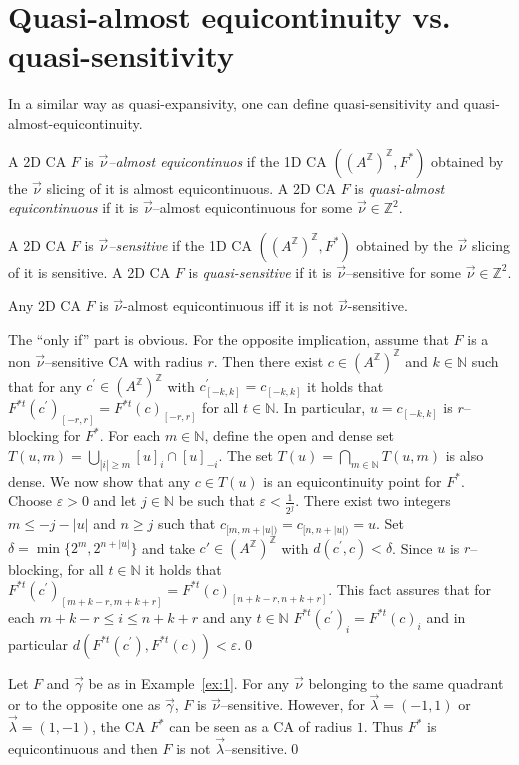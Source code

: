 \documentclass{llncs}
\newcommand{\z}{\ensuremath{\mathbb{Z}}\xspace}
\newcommand{\n}{\ensuremath{\mathbb{N}}\xspace}
\newcommand{\az}{\ensuremath{A^{\mathbb{Z}}}\xspace}
\newcommand{\zdu}{\ensuremath{\mathbb{Z}^2}\xspace}
\newcommand{\para}[1]{(#1)}
\newcommand{\nn}{\vec\nu}
\newcommand{\gv}{\vec\gamma}
\renewcommand{\ll}{\vec \lambda}
\begin{document}
\section{Quasi-almost equicontinuity vs. quasi-sensitivity}
In a similar way as quasi-expansivity, one can define quasi-sensitivity
and quasi-almost-equi\-conti\-nui\-ty.
\begin{definition}
\label{def:almostlike} A 2D CA $F$ is \emph{$\nn$--almost
e\-qui\-con\-ti\-nuos} if the 1D CA $\para{(\az)^{\z},F^*}$ obtained by
the $\nn$ slicing of it is almost equicontinuous. A 2D CA $F$ is
\emph{quasi-almost equicontinuous} if it is $\nn$--almost
equicontinuous for some $\nn\in\zdu$.
\end{definition}
\begin{definition}
\label{def:senslike} A 2D CA $F$ is \emph{$\nn$--sensitive} if the
1D CA $\para{(\az)^{\z},F^*}$ obtained by the $\nn$ slicing of it
is sensitive. A 2D CA $F$ is \emph{quasi-sensitive} if it is
$\nn$--sensitive for some $\nn\in\zdu$.
\end{definition}
\begin{proposition}\label{prop:quasisens}
Any 2D CA $F$ is $\nn$-almost equicontinuous iff it is not
$\nn$-sensitive.
\end{proposition}
\proof
The ``only if'' part is obvious. For the opposite implication,
assume that $F$ is a non $\nn$--sensitive CA with radius $r$.
Then there exist $c\in (\az)^{\z}$ and $k\in\n$ such that for any
$c^\prime\in(\az)^{\z}$ with $c^\prime_{[-k,k]}=c_{[-k,k]}$ it
holds that $F^{*t}(c^\prime)_{[-r,r]}=F^{*t}(c)_{[-r,r]}$ for all
$t\in\n$. In particular, $u=c_{[-k,k]}$ is $r$--blocking for
$F^*$. For each $m\in\n$, define the open and dense set
$T(u,m)=\bigcup_{|i|\geq m} [u]_i\cap [u]_{-i}$. The set
$T(u)=\bigcap_{m\in\n} T(u,m)$ is also dense. We now show that any
$c\in T(u)$ is an equicontinuity point for $F^*$. Choose
$\varepsilon>0$ and let $j\in\n$ be such that
$\varepsilon<\frac{1}{2^j}$. There exist two integers $m\leq
-j-|u|$ and $n\geq j$ such that $c_{[m,m+|u|)}=c_{[n,n+|u|)}=u$.
Set $\delta=\min\{2^{m}, 2^{n+|u|}\}$ and take $c'\in(\az)^{\z}$
with $d(c^\prime,c)<\delta$. Since $u$ is $r$--blocking, for all
$t\in\n$ it holds that
$F^{*t}(c^\prime)_{[m+k-r,m+k+r]}=F^{*t}(c)_{[n+k-r,n+k+r]}$. This
fact assures that for each $m+k-r\leq i\leq n+k+r$ and any
$t\in\n$ $F^{*t}(c^\prime)_i=F^{*t}(c)_i$ and in particular
$d(F^{*t}(c^\prime), F^{*t}(c))<\varepsilon$.\qed


\begin{example}
Let $F$ and $\gv$ be as in Example~\ref{ex:1}. For any $\nn$ belonging
to the same quadrant or to the opposite one as $\gv$, $F$ is $\nn$--sensitive. However, for
$\ll=(-1,1)$ or $\ll=(1,-1)$, the CA $F^*$ can be seen as a CA of
radius $1$. Thus $F^*$ is equicontinuous and then $F$ is not
$\ll$--sensitive.\qed
\end{example}
\end{document}
